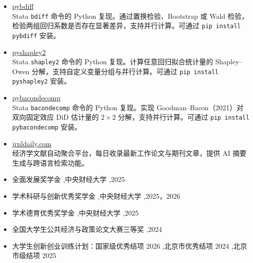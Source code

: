 \documentclass[a4paper,10pt]{article}
\begin{document}
\begin{itemize}

\item \href{https://pypi.org/project/pybdiff/}{pybdiff}\\
  Stata \texttt{bdiff} 命令的 Python 复现。通过置换检验、Bootstrap 或 Wald 检验，检验两组回归系数是否存在显著差异，支持并行计算。可通过 \texttt{pip install pybdiff} 安装。

\item \href{https://pypi.org/project/pyshapley2/}{pyshapley2}\\
  Stata \texttt{shapley2} 命令的 Python 复现。计算任意回归拟合统计量的 Shapley--Owen 分解，支持自定义变量分组与并行计算。可通过 \texttt{pip install pyshapley2} 安装。

\item \href{https://pypi.org/project/pybacondecomp/}{pybacondecomp}\\
  Stata \texttt{bacondecomp} 命令的 Python 复现。实现 Goodman--Bacon（2021）对双向固定效应 DiD 估计量的 $2\times2$ 分解，支持并行计算。可通过 \texttt{pip install pybacondecomp} 安装。

\item \href{https://jrnldaily.com}{jrnldaily.com}\\
  经济学文献自动聚合平台，每日收录最新工作论文与期刊文章，提供 AI 摘要生成与跨语言检索功能。

\end{itemize}


\begin{itemize}

\item 全面发展奖学金 \sep 中央财经大学 \sep 2025
\item 学术科研与创新优秀奖学金 \sep 中央财经大学 \sep 2025，2026
\item 学术德育优秀奖学金 \sep 中央财经大学 \sep 2025
\item 全国大学生公共经济与政策论文大赛三等奖 \sep 2024
\item 大学生创新创业训练计划：国家级优秀结项 2026 \sep 北京市优秀结项 2024 \sep 北京市级结项 2025

\end{itemize}

\bigskip
\noindent{\footnotesize\textcolor{gray}{版本：2026年11月}}
\end{document}
